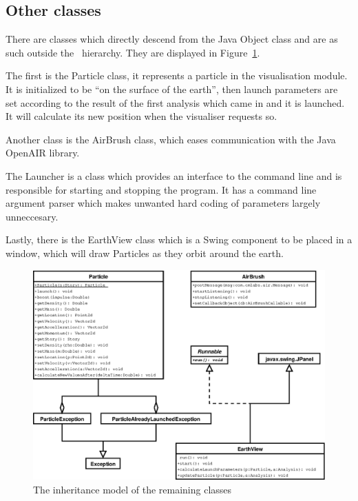 \subsection{Other classes}

There are classes which directly descend from the Java Object class and are as
such outside the \Amber\ hierarchy. They are displayed in
Figure~\ref{fig:class-diagram}.

The first is the Particle class, it represents a particle in the visualisation
module. It is initialized to be ``on the surface of the earth'', then launch
parameters are set according to the result of the first analysis which came in
and it is launched. It will calculate its new position when the visualiser
requests so.

Another class is the AirBrush class, which eases communication with the Java
OpenAIR library.

The Launcher is a class which provides an interface to the command line and is
responsible for starting and stopping the program. It has a command line
argument parser which makes unwanted hard coding of parameters largely
unneccesary.

Lastly, there is the EarthView class which is a Swing component to be placed in
a window, which will draw Particles as they orbit around the earth.

\begin{figure}[htp]
  \centering
  \includegraphics{image/class-diagram}
  \caption{
    \label{fig:class-diagram}
    The inheritance model of the remaining classes}
\end{figure}

